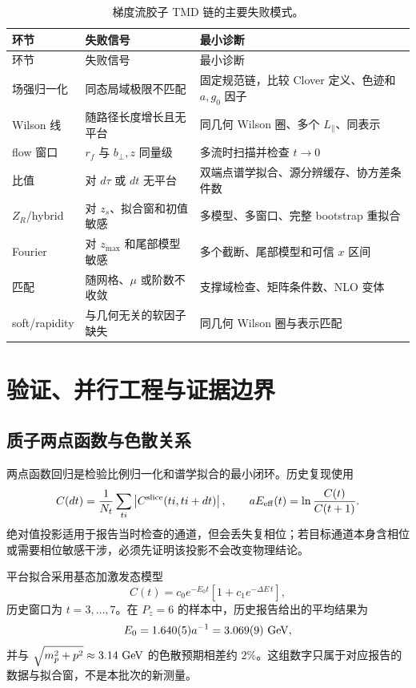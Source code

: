 \begin{longtable}{>{\raggedright\arraybackslash}p{3.1cm}>{\raggedright\arraybackslash}p{3.5cm}>{\raggedright\arraybackslash}p{7.3cm}}
\caption{梯度流胶子 TMD 链的主要失败模式。}\label{tab:b07-failures}\\
\toprule
环节 & 失败信号 & 最小诊断\\
\midrule
\endfirsthead
\toprule
环节 & 失败信号 & 最小诊断\\
\midrule
\endhead
场强归一化 & 同态局域极限不匹配 & 固定规范链，比较 Clover 定义、色迹和 $a,g_0$ 因子\\
Wilson 线 & 随路径长度增长且无平台 & 同几何 Wilson 圈、多个 $L_\parallel$、同表示\\
flow 窗口 & $r_f$ 与 $b_\perp,z$ 同量级 & 多流时扫描并检查 $t\to0$\\
比值 & 对 $d\tau$ 或 $dt$ 无平台 & 双端点谱学拟合、源分辨缓存、协方差条件数\\
$Z_R$/hybrid & 对 $z_s$、拟合窗和初值敏感 & 多模型、多窗口、完整 bootstrap 重拟合\\
Fourier & 对 $z_{\max}$ 和尾部模型敏感 & 多个截断、尾部模型和可信 $x$ 区间\\
匹配 & 随网格、$\mu$ 或阶数不收敛 & 支撑域检查、矩阵条件数、NLO 变体\\
soft/rapidity & 与几何无关的软因子缺失 & 同几何 Wilson 圈与表示匹配\\
\bottomrule
\end{longtable}

\chapter{验证、并行工程与证据边界}

\section{质子两点函数与色散关系}

两点函数回归是检验比例归一化和谱学拟合的最小闭环。历史复现使用
\begin{equation}
  C(dt)=\frac{1}{N_t}\sum_{ti}
  \left|C^{\rm slice}(ti,ti+dt)\right|,
  \qquad
  aE_{\rm eff}(t)=\ln\frac{C(t)}{C(t+1)}.
  \label{eq:b07-corr2}
\end{equation}
绝对值投影适用于报告当时检查的通道，但会丢失复相位；若目标通道本身含相位或需要相位敏感干涉，必须先证明该投影不会改变物理结论。

平台拟合采用基态加激发态模型
\begin{equation}
  C(t)=c_0e^{-E_0t}\left[1+c_1e^{-\Delta E\,t}\right],
  \label{eq:b07-c2fit}
\end{equation}
历史窗口为 $t=3,\ldots,7$。在 $P_z=6$ 的样本中，历史报告给出的平均结果为
\begin{equation}
  E_0=1.640(5)a^{-1}=3.069(9)\ {\rm GeV},
  \label{eq:b07-e0}
\end{equation}
并与 $\sqrt{m_p^2+p^2}\approx3.14\ {\rm GeV}$ 的色散预期相差约 $2\%$。这组数字只属于对应报告的数据与拟合窗，不是本批次的新测量。

